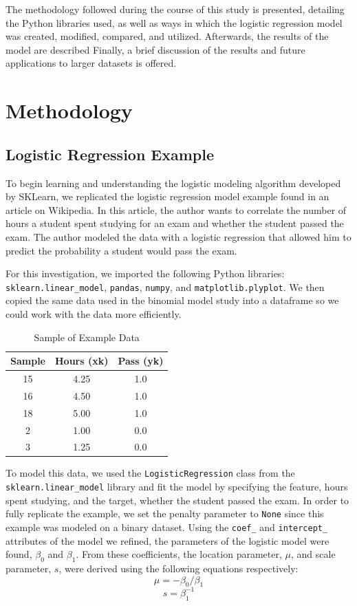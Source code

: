 \documentclass[journal]{IEEEtran}
\begin{document}
The methodology followed during the course of this study is presented, detailing the Python libraries used,  as well as ways in which the logistic regression model was created, modified, compared, and utilized. Afterwards, the results of the model are described Finally, a brief discussion of the results and future applications to larger datasets is offered. 

\section{Methodology}

\subsection{Logistic Regression Example}
To begin learning and understanding the logistic modeling algorithm developed by SKLearn, we replicated the logistic regression model example found in an article on Wikipedia. In this article, the author wants to correlate the number of hours a student spent studying for an exam and whether the student passed the exam. The author modeled the data with a logistic regression that allowed him to predict the probability a student would pass the exam.

For this investigation, we imported the following Python libraries: \lstinline{sklearn.linear_model}, \lstinline{pandas}, \lstinline{numpy}, and \lstinline{matplotlib.plyplot}. We then copied the same data used in the binomial model study into a dataframe so we could work with the data more efficiently. 

\begin{table}[h!]
\centering
\begin{tabular}{c c c}
    Sample & Hours (xk) &	Pass (yk) \\
    \hline
    15	& 4.25	& 1.0 \\
    16	& 4.50	& 1.0 \\
    18	& 5.00	& 1.0 \\
    2	& 1.00	& 0.0 \\
    3	& 1.25	& 0.0
\end{tabular}    
\caption{Sample of Example Data}
\end{table}

To model this data, we used the \lstinline{LogisticRegression} class from the \lstinline{sklearn.linear_model} library and fit the model by specifying the feature, hours spent studying, and the target, whether the student passed the exam. In order to fully replicate the example, we set the penalty parameter to \lstinline{None} since this example was modeled on a binary dataset. Using the \lstinline{coef_} and \lstinline{intercept_} attributes of the model we refined, the parameters of the logistic model were found, $\beta_0$ and $\beta_1$. From these coefficients, the location parameter, $\mu$, and scale parameter, \(s\), were derived using the following equations respectively:
\[ \mu =  -\beta_0 / \beta_1\] 
\[ s = \beta_1^{-1} \]
\end{document}
